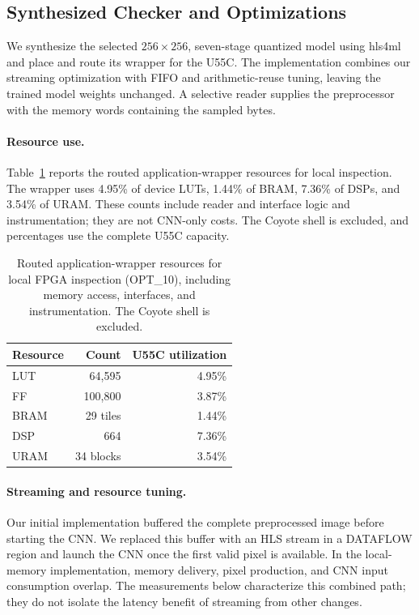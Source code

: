 \documentclass[acmsmall]{acmart}
\begin{document}
\subsection{Synthesized Checker and Optimizations}
\label{sec:eval-hardware}

We synthesize the selected $256\times256$, seven-stage quantized model using
hls4ml and place and route its wrapper for the U55C. The implementation combines
our streaming optimization with FIFO and arithmetic-reuse tuning, leaving the
trained model weights unchanged. A selective reader supplies the preprocessor
with the memory words containing the sampled bytes.

\paragraph{Resource use.}
Table~\ref{tab:hardware-results} reports the routed application-wrapper
resources for local inspection. The wrapper uses 4.95\% of device LUTs,
1.44\% of BRAM, 7.36\% of DSPs, and 3.54\% of URAM. These counts include
reader and interface logic and instrumentation; they are not CNN-only costs.
The Coyote shell is excluded, and percentages use the complete U55C capacity.

\begin{table}[tbp]
    \centering
    \caption{Routed application-wrapper resources for local FPGA inspection
    (OPT\_10), including memory access, interfaces, and instrumentation.
    The Coyote shell is excluded.}
    \label{tab:hardware-results}
    \small
    \begin{tabular}{@{}lrr@{}}
        \toprule
        Resource & Count & U55C utilization \\
        \midrule
        LUT & 64,595 & 4.95\% \\
        FF & 100,800 & 3.87\% \\
        BRAM & 29 tiles & 1.44\% \\
        DSP & 664 & 7.36\% \\
        URAM & 34 blocks & 3.54\% \\
        \bottomrule
    \end{tabular}
\end{table}

\paragraph{Streaming and resource tuning.}
Our initial implementation buffered the complete preprocessed image before
starting the CNN. We replaced this buffer with an HLS stream in a DATAFLOW
region and launch the CNN once the first valid pixel is available. In the
local-memory implementation, memory delivery, pixel production, and CNN input
consumption overlap. The measurements below characterize this combined path;
they do not isolate the latency benefit of streaming from other changes.
\end{document}
